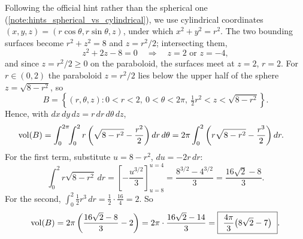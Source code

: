 \begin{exercisesolution}
\label{sol:paraboloid_hypersurface_volume}
Following the official hint rather than the spherical one
(\cref{note:hints_spherical_vs_cylindrical}), we use
cylindrical coordinates $(x,y,z) = (r\cos\theta,r\sin\theta,z)$, under which $x^2+y^2=r^2$.
The two bounding surfaces become $r^2+z^2=8$ and $z = r^2/2$; intersecting them,
\[z^2+2z-8 = 0 \quad\Longrightarrow\quad z = 2 \text{ or } z=-4,\]
and since $z=r^2/2\geq0$ on the paraboloid, the surfaces meet at $z=2$, $r=2$. For
$r \in (0,2)$ the paraboloid $z=r^2/2$ lies below the upper half of the sphere
$z=\sqrt{8-r^2}$, so
\[B = \left\{(r,\theta,z) : 0<r<2,\ 0<\theta<2\pi,\ \tfrac12r^2 < z < \sqrt{8-r^2}\right\}.\]
Hence, with $dx\,dy\,dz = r\,dr\,d\theta\,dz$,
\[
\begin{aligned}
\operatorname{vol}(B) &= \int_0^{2\pi}\!\!\int_0^2 r\left(\sqrt{8-r^2} - \frac{r^2}{2}\right)dr\,d\theta
  = 2\pi\int_0^2 \left(r\sqrt{8-r^2} - \frac{r^3}{2}\right)dr.
\end{aligned}
\]
For the first term, substitute $u = 8-r^2$, $du=-2r\,dr$:
\[\int_0^2 r\sqrt{8-r^2}\,dr = \left[-\frac{u^{3/2}}{3}\right]_{u=8}^{u=4}
  = \frac{8^{3/2}-4^{3/2}}{3} = \frac{16\sqrt2-8}{3}.\]
For the second, $\int_0^2 \tfrac12 r^3\,dr = \tfrac12\cdot\tfrac{16}{4} = 2$. So
\[\operatorname{vol}(B) = 2\pi\left(\frac{16\sqrt2-8}{3} - 2\right) = 2\pi\cdot\frac{16\sqrt2-14}{3}
  = \boxed{\ \frac{4\pi}{3}\big(8\sqrt2-7\big)\ }.\]
\end{exercisesolution}

